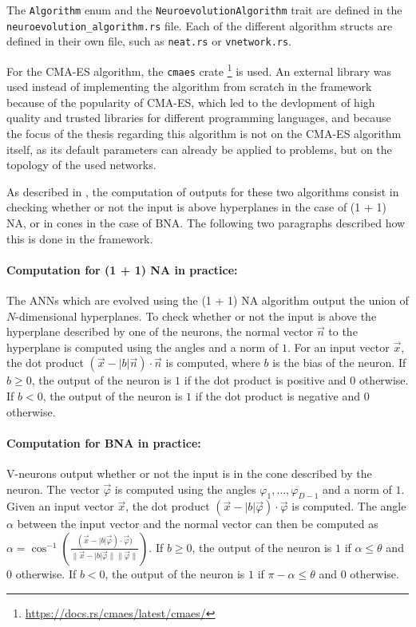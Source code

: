 The \texttt{Algorithm} enum and the \texttt{NeuroevolutionAlgorithm} trait are defined in the \\ \texttt{neuroevolution\_algorithm.rs} file.
Each of the different algorithm structs are defined in their own file, such as \texttt{neat.rs} or \texttt{vnetwork.rs}.

For the CMA-ES algorithm, the \texttt{cmaes} crate \footnote{\url{https://docs.rs/cmaes/latest/cmaes/}}  is used. An external library was used instead of implementing
the algorithm from scratch in the framework because of the popularity of CMA-ES, which led to the devlopment of high quality and trusted libraries for different programming
languages, and because the focus of the thesis regarding this algorithm is not on the CMA-ES algorithm itself, as its default parameters can already be applied to problems, but
on the topology of the used networks.

As described in , the computation of outputs for these two algorithms consist in checking whether or
not the input is above hyperplanes in the case of (1 + 1) NA, or in cones in the case of BNA. The following two paragraphs described how this is done in the framework.

\paragraph{Computation for (1 + 1) NA in practice: }
The ANNs which are evolved using the (1 + 1) NA algorithm output the union of $N$-dimensional hyperplanes. To check whether or not the input is above the
hyperplane described by one of the neurons, the normal vector $\overrightarrow{n}$ to the hyperplane is computed using the angles and a norm of $1$.
For an input vector $\overrightarrow{x}$, the dot product $(\overrightarrow{x} - \lvert b \rvert \overrightarrow{n}) \cdot \overrightarrow{n}$ is computed, where
$b$ is the bias of the neuron. If $b \geq 0$, the output of the neuron is $1$ if the dot product is positive and $0$ otherwise. If $b < 0$,
the output of the neuron is $1$ if the dot product is negative and $0$ otherwise.

\paragraph{Computation for BNA in practice: }
V-neurons output whether or not the input is in the cone described by the neuron. The vector $\overrightarrow{\varphi}$ is computed using the angles $\varphi_1, \ldots, \varphi_{D-1}$
and a norm of $1$. Given an input vector $\overrightarrow{x}$, the dot product $(\overrightarrow{x} - \lvert b \rvert \overrightarrow{\varphi}) \cdot \overrightarrow{\varphi}$ is computed.
The angle $\alpha$ between the input vector and the normal vector can then be computed as
$\alpha = \cos^{-1}(\frac{(\overrightarrow{x} - \lvert b \rvert \overrightarrow{\varphi}) \cdot \overrightarrow{\varphi})}{\lVert \overrightarrow{x} - \lvert b \rvert \overrightarrow{\varphi} \rVert
\lVert \overrightarrow{\varphi} \rVert})$. If $b \geq 0$, the output of the neuron is $1$ if $\alpha \leq \theta$ and $0$ otherwise. If $b < 0$, the output of the neuron is
$1$ if $\pi - \alpha \leq \theta$ and $0$ otherwise.


